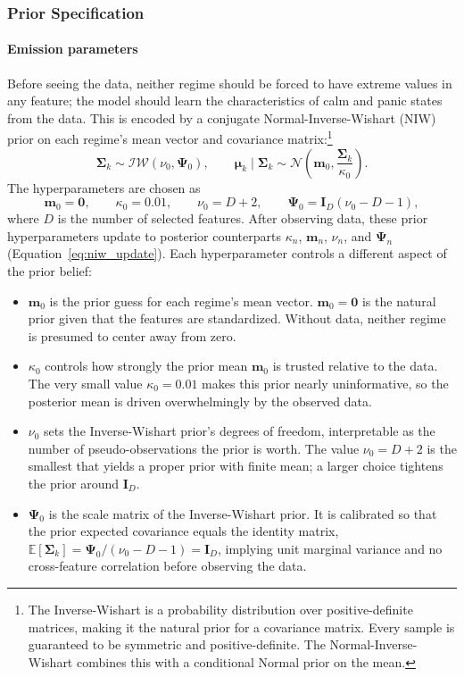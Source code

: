 \subsubsection{Prior Specification}\label{sec:priors}

\paragraph{Emission parameters}
Before seeing the data, neither regime should be forced to have extreme values in any feature; the model should learn the characteristics of calm and panic states from the data. This is encoded by a conjugate Normal-Inverse-Wishart (NIW) prior on each regime's mean vector and covariance matrix:\footnote{The Inverse-Wishart is a probability distribution over positive-definite matrices, making it the natural prior for a covariance matrix. Every sample is guaranteed to be symmetric and positive-definite. The Normal-Inverse-Wishart combines this with a conditional Normal prior on the mean.}
\begin{equation}
\boldsymbol{\Sigma}_k \sim \mathcal{IW}(\nu_0,\boldsymbol{\Psi}_0),
\qquad
\boldsymbol{\mu}_k \mid \boldsymbol{\Sigma}_k
\sim
\mathcal{N}\!\left(\mathbf{m}_0,\frac{\boldsymbol{\Sigma}_k}{\kappa_0}\right).
\end{equation}
The hyperparameters are chosen as
\begin{equation}\label{eq:niw_hyperparams}
\mathbf{m}_0 = \mathbf{0},\qquad
\kappa_0 = 0.01,\qquad
\nu_0 = D+2,\qquad
\boldsymbol{\Psi}_0 = \mathbf{I}_D(\nu_0-D-1),
\end{equation}
where $D$ is the number of selected features. After observing data, these prior hyperparameters update to posterior counterparts $\kappa_n$, $\mathbf{m}_n$, $\nu_n$, and $\boldsymbol{\Psi}_n$ (Equation~\ref{eq:niw_update}). Each hyperparameter controls a different aspect of the prior belief:
\begin{itemize}
    \item $\mathbf{m}_0$ is the prior guess for each regime's mean vector. $\mathbf{m}_0 = \mathbf{0}$ is the natural prior given that the features are standardized. Without data, neither regime is presumed to center away from zero.
    \item $\kappa_0$ controls how strongly the prior mean $\mathbf{m}_0$ is trusted relative to the data. The very small value $\kappa_0 = 0.01$ makes this prior nearly uninformative, so the posterior mean is driven overwhelmingly by the observed data.
    \item $\nu_0$ sets the Inverse-Wishart prior's degrees of freedom, interpretable as the number of pseudo-observations the prior is worth. The value $\nu_0 = D + 2$ is the smallest that yields a proper prior with finite mean; a larger choice tightens the prior around $\mathbf{I}_D$.
    \item $\boldsymbol{\Psi}_0$ is the scale matrix of the Inverse-Wishart prior. It is calibrated so that the prior expected covariance equals the identity matrix, $\mathbb{E}[\boldsymbol{\Sigma}_k] = \boldsymbol{\Psi}_0 / (\nu_0 - D - 1) = \mathbf{I}_D$, implying unit marginal variance and no cross-feature correlation before observing the data.
\end{itemize}

